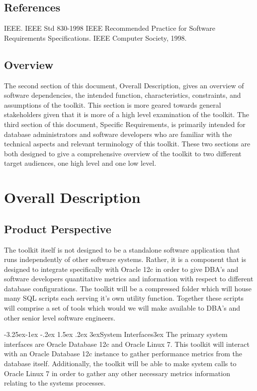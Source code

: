 \documentclass[draftclsnofoot, onecolumn, compsoc, 10pt]{IEEEtran}
\makeatletter
\newcommand\Xsubsubsection{\@startsection{subsubsection}{3}{\z@}%
                                     {-3.25ex\@plus -1ex \@minus -.2ex}%
                                     {1.5ex \@plus .2ex}%
                                     {\normalfont\normalsize\leftskip 3ex}}
\renewcommand\subsubsection[1]{\Xsubsubsection{#1}\leftskip 3ex}
\makeatother
\begin{document}
\subsection{References}
IEEE.   IEEE Std 830-1998 IEEE Recommended Practice for Software Requirements Specifications. IEEE Computer Society, 1998.

\subsection{Overview}
The second section of this document, Overall Description, gives an overview of software dependencies, the intended function, characteristics, constraints, and assumptions of the toolkit.
This section is more geared towards general stakeholders given that it is more of a high level examination of the toolkit.
The third section of this document, Specific Requirements, is primarily intended for database administrators and software developers who are familiar with the technical aspects and relevant terminology of this toolkit.
These two sections are both designed to give a comprehensive overview of the toolkit to two different target audiences, one high level and one low level.

\section{Overall Description}

\subsection{Product Perspective}
The toolkit itself is not designed to be a standalone software application that runs independently of other software systems.
Rather, it is a component that is designed to integrate specifically with Oracle 12c in order to give DBA's and software developers quantitative metrics and information with respect to different database configurations.
The toolkit will be a compressed folder which will house many SQL scripts each serving it's own utility function.
Together these scripts will comprise a set of tools which would we will make available to DBA's and other senior level software engineers.

\subsubsection{System Interfaces}
The primary system interfaces are Oracle Database 12c and Oracle Linux 7.
This toolkit will interact with an Oracle Database 12c instance to gather performance metrics from the database itself.
Additionally, the toolkit will be able to make system calls to Oracle Linux 7 in order to gather any other necessary metrics information relating to the systems processes.
\end{document}
